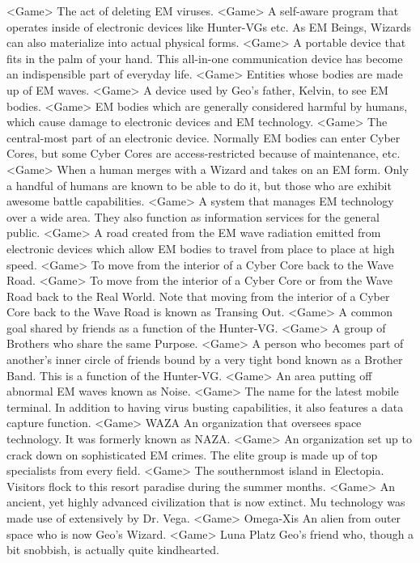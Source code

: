 <Game> The act of deleting EM viruses. 
<Game> A self-aware program that operates inside of electronic devices like Hunter-VGs etc. 
As EM Beings, Wizards can also materialize into actual physical forms. 
<Game> A portable device that fits in the palm of your hand. This all-in-one communication device has become an indispensible part of everyday life. 
<Game> Entities whose bodies are made up of EM waves. 
<Game> A device used by Geo's father, Kelvin, to see EM bodies. 
<Game> EM bodies which are generally considered harmful by humans, which cause damage to electronic devices and EM technology. 
<Game> The central-most part of an electronic device. 
Normally EM bodies can enter Cyber Cores, but some Cyber Cores are access-restricted because of maintenance, etc. 
<Game> When a human merges with a Wizard and takes on an EM form. 
Only a handful of humans are known to be able to do it, but those who are exhibit awesome battle capabilities. 
<Game> A system that manages EM technology over a wide area. They also function as information services for the general public. 
<Game> A road created from the EM wave radiation emitted from electronic devices which allow EM bodies to travel from place to place at high speed. 
<Game> To move from the interior of a Cyber Core back to the Wave Road. 
<Game> To move from the interior of a Cyber Core or from the Wave Road back to the Real World. 
Note that moving from the interior of a Cyber Core back to the Wave Road is known as Transing Out. 
<Game> A common goal shared by friends as a function of the Hunter-VG. 
<Game> A group of Brothers who share the same Purpose. 
<Game> A person who becomes part of another's inner circle of friends bound by a very tight bond 
known as a Brother Band. This is a function of the Hunter-VG. 
<Game> An area putting off abnormal EM waves known as Noise. 
<Game> The name for the latest mobile terminal. In addition to having virus busting capabilities, it also features a data capture function. 
<Game> WAZA An organization that oversees space technology. It was formerly known as NAZA. 
<Game> An organization set up to crack down on sophisticated EM crimes. The elite group is made up of top specialists from every field. 
<Game> The southernmost island in Electopia. Visitors flock to this resort paradise during the summer months. 
<Game> An ancient, yet highly advanced civilization that is now extinct. Mu technology was made use of extensively by Dr. Vega. 
<Game> Omega-Xis An alien from outer space who is now Geo's Wizard. 
<Game> Luna Platz Geo's friend who, though a bit snobbish, is actually quite kindhearted. 
